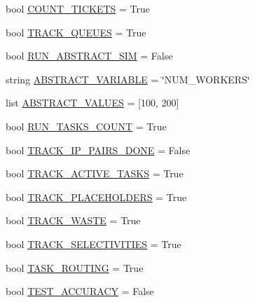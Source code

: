 \begin{DoxyCompactItemize}
\item 
bool \mbox{\hyperlink{namespacedynamicfilterapp_1_1toggles_ac35fabae4c109189ac40e759f367ee79}{C\+O\+U\+N\+T\+\_\+\+T\+I\+C\+K\+E\+TS}} = True
\item 
bool \mbox{\hyperlink{namespacedynamicfilterapp_1_1toggles_a170d7dba5203e9b2ab89eb541ed83b3a}{T\+R\+A\+C\+K\+\_\+\+Q\+U\+E\+U\+ES}} = True
\item 
bool \mbox{\hyperlink{namespacedynamicfilterapp_1_1toggles_a73b7b22a82dc40407d03e22dca8ac257}{R\+U\+N\+\_\+\+A\+B\+S\+T\+R\+A\+C\+T\+\_\+\+S\+IM}} = False
\item 
string \mbox{\hyperlink{namespacedynamicfilterapp_1_1toggles_a05ba5c39ee5a05284597d091b01650a3}{A\+B\+S\+T\+R\+A\+C\+T\+\_\+\+V\+A\+R\+I\+A\+B\+LE}} = \char`\"{}N\+U\+M\+\_\+\+W\+O\+R\+K\+E\+RS\char`\"{}
\item 
list \mbox{\hyperlink{namespacedynamicfilterapp_1_1toggles_ab64c8432c11e4b89425ac1f220ca01a9}{A\+B\+S\+T\+R\+A\+C\+T\+\_\+\+V\+A\+L\+U\+ES}} = \mbox{[}100, 200\mbox{]}
\item 
bool \mbox{\hyperlink{namespacedynamicfilterapp_1_1toggles_a904bebe166c12146cac5f4dec979450c}{R\+U\+N\+\_\+\+T\+A\+S\+K\+S\+\_\+\+C\+O\+U\+NT}} = True
\item 
bool \mbox{\hyperlink{namespacedynamicfilterapp_1_1toggles_ac1bb03e2d3e1f9304e6628d802795547}{T\+R\+A\+C\+K\+\_\+\+I\+P\+\_\+\+P\+A\+I\+R\+S\+\_\+\+D\+O\+NE}} = False
\item 
bool \mbox{\hyperlink{namespacedynamicfilterapp_1_1toggles_a9c5fce243b39b491bbdf705555a92617}{T\+R\+A\+C\+K\+\_\+\+A\+C\+T\+I\+V\+E\+\_\+\+T\+A\+S\+KS}} = True
\item 
bool \mbox{\hyperlink{namespacedynamicfilterapp_1_1toggles_a2be074e9eca6d662578ca68c95050ad3}{T\+R\+A\+C\+K\+\_\+\+P\+L\+A\+C\+E\+H\+O\+L\+D\+E\+RS}} = True
\item 
bool \mbox{\hyperlink{namespacedynamicfilterapp_1_1toggles_ab80874aebf30b9d13f7928d5ecbd6ae2}{T\+R\+A\+C\+K\+\_\+\+W\+A\+S\+TE}} = True
\item 
bool \mbox{\hyperlink{namespacedynamicfilterapp_1_1toggles_acc098c8abb66db6192e90e5b54413c39}{T\+R\+A\+C\+K\+\_\+\+S\+E\+L\+E\+C\+T\+I\+V\+I\+T\+I\+ES}} = True
\item 
bool \mbox{\hyperlink{namespacedynamicfilterapp_1_1toggles_a267ac7f08878f62c6031a8fb38aa695b}{T\+A\+S\+K\+\_\+\+R\+O\+U\+T\+I\+NG}} = True
\item 
bool \mbox{\hyperlink{namespacedynamicfilterapp_1_1toggles_a899bd5bdb20b1d0a0592390572cc4e87}{T\+E\+S\+T\+\_\+\+A\+C\+C\+U\+R\+A\+CY}} = False

\end{DoxyCompactItemize}
